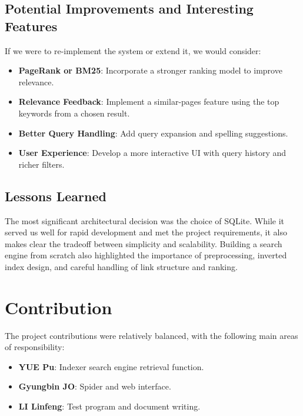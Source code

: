 \documentclass[11pt,a4paper]{article}
\begin{document}
\subsection{Potential Improvements and Interesting Features}
If we were to re-implement the system or extend it, we would consider:
\begin{itemize}
    \item \textbf{PageRank or BM25}: Incorporate a stronger ranking model to improve relevance.
    \item \textbf{Relevance Feedback}: Implement a similar-pages feature using the top keywords from a chosen result.
    \item \textbf{Better Query Handling}: Add query expansion and spelling suggestions.
    \item \textbf{User Experience}: Develop a more interactive UI with query history and richer filters.
\end{itemize}

\subsection{Lessons Learned}
The most significant architectural decision was the choice of SQLite. While it served us well for rapid development and met the project requirements, it also makes clear the tradeoff between simplicity and scalability. Building a search engine from scratch also highlighted the importance of preprocessing, inverted index design, and careful handling of link structure and ranking.

\section{Contribution}
The project contributions were relatively balanced, with the following main areas of responsibility:
\begin{itemize}
    \item \textbf{YUE Pu}: Indexer search engine retrieval function.
    \item \textbf{Gyungbin JO}: Spider and web interface.
    \item \textbf{LI Linfeng}: Test program and document writing.
\end{itemize}
\end{document}
